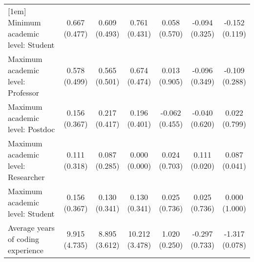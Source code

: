 \begin{table}[ht]
{\begin{tabular}{lcccccc}
[1em]
Minimum academic level: Student & \shortstack{0.667\\(0.477)} & \shortstack{0.609\\(0.493)} & \shortstack{0.761\\(0.431)} & \shortstack{0.058\\(0.570)} & \shortstack{-0.094\\(0.325)} & \shortstack{-0.152\\(0.119)}\\
[1em]
Maximum academic level: Professor & \shortstack{0.578\\(0.499)} & \shortstack{0.565\\(0.501)} & \shortstack{0.674\\(0.474)} & \shortstack{0.013\\(0.905)} & \shortstack{-0.096\\(0.349)} & \shortstack{-0.109\\(0.288)}\\
[1em]
Maximum academic level: Postdoc & \shortstack{0.156\\(0.367)} & \shortstack{0.217\\(0.417)} & \shortstack{0.196\\(0.401)} & \shortstack{-0.062\\(0.455)} & \shortstack{-0.040\\(0.620)} & \shortstack{0.022\\(0.799)}\\
[1em]
Maximum academic level: Researcher & \shortstack{0.111\\(0.318)} & \shortstack{0.087\\(0.285)} & \shortstack{0.000\\(0.000)} & \shortstack{0.024\\(0.703)} & \shortstack{0.111\\(0.020)} & \shortstack{0.087\\(0.041)}\\
[1em]
Maximum academic level: Student & \shortstack{0.156\\(0.367)} & \shortstack{0.130\\(0.341)} & \shortstack{0.130\\(0.341)} & \shortstack{0.025\\(0.736)} & \shortstack{0.025\\(0.736)} & \shortstack{0.000\\(1.000)}\\
[1em]
Average years of coding experience & \shortstack{9.915\\(4.735)} & \shortstack{8.895\\(3.612)} & \shortstack{10.212\\(3.478)} & \shortstack{1.020\\(0.250)} & \shortstack{-0.297\\(0.733)} & \shortstack{-1.317\\(0.078)}\\

\end{tabular}}
\end{table}
